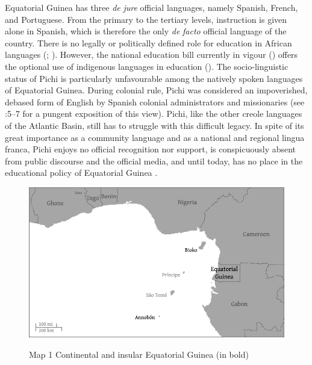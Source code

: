 Equatorial Guinea has three \textit{de} \textit{jure} official languages, namely Spanish, French, and Portuguese. From the primary to the tertiary levels, instruction is given alone in Spanish, which is therefore the only \textit{de} \textit{facto} official language of the country. There is no legally or politically defined role for education in African languages (\citealt{Yakpo2011}; \citealt{Yakpo2016}). However, the national education bill currently in vigour (\citealt{RepublicadeGuineaEcuatorial2007}) offers the optional use of indigenous languages in education (\citealt{OloFernandes2012}). The socio-linguistic status of Pichi is particularly unfavourable among the natively spoken languages of Equatorial Guinea. During colonial rule, Pichi was considered an impoverished, debased form of English by Spanish colonial administrators and missionaries (see \citealt{Zarco1938}:5–7 for a pungent exposition of this view). Pichi, like the other creole languages of the Atlantic Basin, still has to struggle with this difficult legacy. In spite of its great importance as a community language and as a national and regional lingua franca, Pichi enjoys no official recognition nor support, is conspicuously absent from public discourse and the official media, and until today, has no place in the educational policy of Equatorial Guinea \citep{Yakpo2016}.


\begin{figure}
	\caption{Map 1 Continental and insular Equatorial Guinea (in bold)}
	\includegraphics[width=\textwidth]{figures/yakpomod-img1.png}
	\label{map:key:1.1}
\end{figure}

